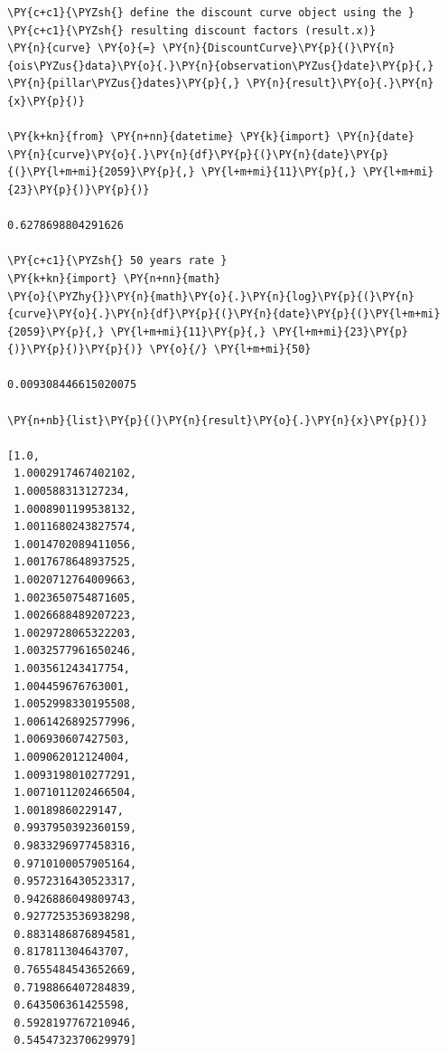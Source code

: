 \begin{tcolorbox}[breakable, size=fbox, boxrule=1pt, pad at break*=1mm,colback=cellbackground, colframe=cellborder]
\begin{Verbatim}[commandchars=\\\{\}]
\PY{c+c1}{\PYZsh{} define the discount curve object using the }
\PY{c+c1}{\PYZsh{} resulting discount factors (result.x)}
\PY{n}{curve} \PY{o}{=} \PY{n}{DiscountCurve}\PY{p}{(}\PY{n}{ois\PYZus{}data}\PY{o}{.}\PY{n}{observation\PYZus{}date}\PY{p}{,} \PY{n}{pillar\PYZus{}dates}\PY{p}{,} \PY{n}{result}\PY{o}{.}\PY{n}{x}\PY{p}{)}

\PY{k+kn}{from} \PY{n+nn}{datetime} \PY{k}{import} \PY{n}{date}
\PY{n}{curve}\PY{o}{.}\PY{n}{df}\PY{p}{(}\PY{n}{date}\PY{p}{(}\PY{l+m+mi}{2059}\PY{p}{,} \PY{l+m+mi}{11}\PY{p}{,} \PY{l+m+mi}{23}\PY{p}{)}\PY{p}{)}

0.6278698804291626

\PY{c+c1}{\PYZsh{} 50 years rate }
\PY{k+kn}{import} \PY{n+nn}{math}
\PY{o}{\PYZhy{}}\PY{n}{math}\PY{o}{.}\PY{n}{log}\PY{p}{(}\PY{n}{curve}\PY{o}{.}\PY{n}{df}\PY{p}{(}\PY{n}{date}\PY{p}{(}\PY{l+m+mi}{2059}\PY{p}{,} \PY{l+m+mi}{11}\PY{p}{,} \PY{l+m+mi}{23}\PY{p}{)}\PY{p}{)}\PY{p}{)} \PY{o}{/} \PY{l+m+mi}{50}

0.009308446615020075

\PY{n+nb}{list}\PY{p}{(}\PY{n}{result}\PY{o}{.}\PY{n}{x}\PY{p}{)}

[1.0,
 1.0002917467402102,
 1.000588313127234,
 1.0008901199538132,
 1.0011680243827574,
 1.0014702089411056,
 1.0017678648937525,
 1.0020712764009663,
 1.0023650754871605,
 1.0026688489207223,
 1.0029728065322203,
 1.0032577961650246,
 1.003561243417754,
 1.004459676763001,
 1.0052998330195508,
 1.0061426892577996,
 1.006930607427503,
 1.009062012124004,
 1.0093198010277291,
 1.0071011202466504,
 1.00189860229147,
 0.9937950392360159,
 0.9833296977458316,
 0.9710100057905164,
 0.9572316430523317,
 0.9426886049809743,
 0.9277253536938298,
 0.8831486876894581,
 0.817811304643707,
 0.7655484543652669,
 0.7198866407284839,
 0.643506361425598,
 0.5928197767210946,
 0.5454732370629979]
\end{Verbatim}
\end{tcolorbox}
